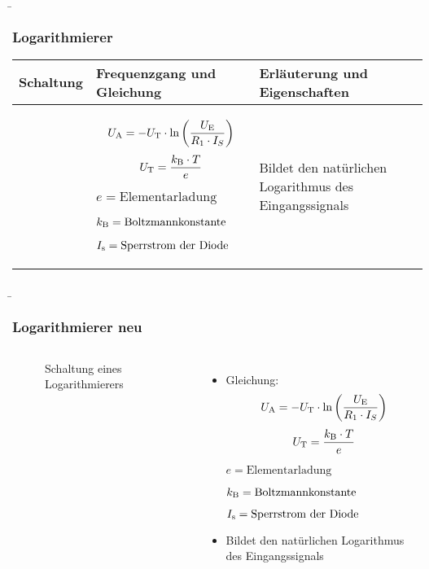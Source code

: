 \begin{frame}
    \b{
    \frametitle{Logarithmierer}
    \centering
    \begin{table}[ht]
    \label{tab:Logarithmierer}
    \begin{tabular}{|m{}|m{}|m{}|}
    \hline
    Schaltung & Frequenzgang und Gleichung & Erläuterung und Eigenschaften\\ %
    \hline
    \vspace{0.5cm}
    \centering
    
    &
    \begin{center}
    \[
    U_{\textnormal{A}} =-U_{\textnormal{T}}\cdot \ln{\left(\frac{U_{\textnormal{E}}}{R_1\cdot I_S}\right)}
    \]
        \[
            U_{\textnormal{T}} = \frac{k_{\textnormal{B}} \cdot T}{e}
            \]
            
            \(e = \text{Elementarladung}\)
            
            \(k_{\textnormal{B}} = \text{Boltzmannkonstante}\)
            
            \(I_{\textnormal{s}} = \text{Sperrstrom der Diode}\)
    \end{center} 
    & 
    Bildet den natürlichen Logarithmus des Eingangssignals \\
    \hline
    \end{tabular}
    \end{table}
    }
\end{frame}

\begin{frame}
    \b{
    \frametitle{Logarithmierer neu}
    \begin{columns}
        \centering
        \begin{figure}
    \centering
        
        \caption{Schaltung eines Logarithmierers}

\end{figure}

        \raggedleft
        \begin{itemize}
            \item Gleichung:
           \[
    U_{\textnormal{A}} =-U_{\textnormal{T}}\cdot \ln{\left(\frac{U_{\textnormal{E}}}{R_1\cdot I_S}\right)}
    \]
        \[
            U_{\textnormal{T}} = \frac{k_{\textnormal{B}} \cdot T}{e}
            \]
            
            \(e = \text{Elementarladung}\)
            
            \(k_{\textnormal{B}} = \text{Boltzmannkonstante}\)
            
            \(I_{\textnormal{s}} = \text{Sperrstrom der Diode}\)
        \item Bildet den natürlichen Logarithmus des Eingangssignals
    \end{itemize}
    \end{columns}
    }
\end{frame}

